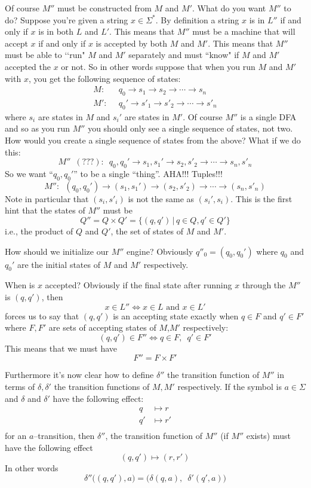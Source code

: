 Of course $M''$ must be constructed from $M$ and $M'$. What do you
want $M''$ to do? Suppose you're given a string $x \in \Sigma^*$. By
definition a string $x$ is in $L''$ if and only if $x$ is in both
$L$ and $L'$. This means that $M''$ must be a machine that will
accept $x$ if and only if $x$ is accepted by both $M$ and $M'$. This
means that $M''$ must be able to \lq\lq run" $M$ and $M'$ separately
and must ``know" if $M$ and $M'$ accepted the $x$ or not. So in
other words suppose that when you run $M$ and $M'$ with $x$, you get
the following sequence of states:
\begin{align*}
M: \,\,\, &q_0 \rightarrow s_1 \rightarrow s_2 \rightarrow \cdots \rightarrow s_n \\
M': \,\,\, &q_0' \rightarrow s'_1 \rightarrow s'_2 \rightarrow
\cdots \rightarrow s'_n
\end{align*}
where $s_i$ are states in $M$ and $s_i'$ are states in $M'$. Of
course $M''$ is a single DFA and so as you run $M''$ you should
only see a single sequence of states, not two. How would you
create a single sequence of states from the above? What if we do
this:
\[
M'' \,\,\, (???): \,\,\, q_0,q_0' \rightarrow s_1,s_1' \rightarrow
s_2, s'_2 \rightarrow \cdots \rightarrow s_n,s'_n
\]
So we want ``$q_0,q_0'$'' to be a single ``thing''. AHA!!!
Tuples!!!
\[
M'': \,\,\, (q_0,q_0') \rightarrow (s_1,s_1') \rightarrow (s_2,
s'_2) \rightarrow \cdots \rightarrow (s_n,s'_n)
\]
Note in particular that $(s_i,s'_i)$ is not the same as
$(s_i',s_i)$.
This is the first hint that the states of $M''$ must
be
\[
 Q'' = Q \times Q' = \{(q,q') \,|\, q\in Q, q'\in Q'\}
\]
i.e., the product of $Q$ and $Q'$, the set of states of $M$ and
$M'$.

How should we initialize our $M''$ engine? Obviously $q''_0 =
(q_0,q_0')$ where $q_0$ and $q_0'$ are the initial states of $M$
and $M'$ respectively.

When is $x$ accepted? Obviously if the final state after running
$x$ through the $M''$ is $(q,q')$, then
\[
 x \in L'' \iff x \in L \text{ and } x \in L'
\]
forces us to say that $(q,q')$ is an accepting state exactly when
$q \in F$ and $q'\in F'$ where $F,F'$ are sets of accepting states
of $M$,$M'$ respectively:
\[
   (q,q') \in F'' \iff q \in F, \,\,\, q' \in F'
\]
This means that we must have
\[
 F'' = F \times F'
\]

Furthermore it's now clear how to define $\delta''$ the transition
function of $M''$ in terms of $\delta, \delta'$ the transition
functions of $M,M'$ respectively. If the symbol is $a \in \Sigma$
and $\delta$ and $\delta'$ have the following effect:
\begin{align*}
 q &\mapsto r \\
 q' &\mapsto r' \\
\end{align*}
for an $a$--transition, then $\delta''$, the transition function
of $M''$ (if $M''$ exists) must have the following effect
\[
(q,q') \mapsto (r,r')
\] In other words
\[
 \delta'' \biggl( (q,q'),a \biggr) = \biggl( \delta(q,a), \,\,\, \delta'(q',a) \biggr)
\]

